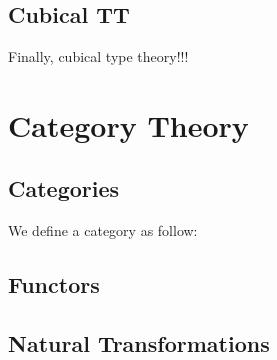 \begin{code}[hide]%
\>[0]\AgdaSymbol{\{-\#}\AgdaSpace{}%
\AgdaSpace{}%
\AgdaSpace{}%
\AgdaSymbol{\#-\}}\<%
\\
\>[0]\AgdaSpace{}%
\AgdaSpace{}%
\<%
\end{code}

\subsection*{Cubical TT}

Finally, cubical type theory!!!

\section{Category Theory}

\subsection*{Categories}

We define a category as follow:



\subsection*{Functors}


\subsection*{Natural Transformations}

